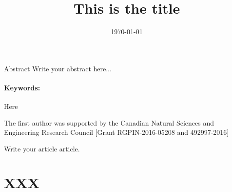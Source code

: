 \documentclass[gdplain]{geradwp}
\title{This is the title}
\date{\today}
\newcommand{\0}{\V{0}}
\newcommand{\1}{\V{1}}
\begin{document}
 

\GDpageCouverture

\begin{GDpagetitre}

\begin{GDauthlist}
\end{GDauthlist}

\begin{GDaffillist}
\end{GDaffillist}

\begin{GDemaillist}
\end{GDemaillist}

\end{GDpagetitre}


\GDabstracts

\begin{GDabstract}{Abstract}
Write your abstract here...

\paragraph{Keywords: }
Here
\end{GDabstract}




\begin{GDacknowledgements}
The first author was supported by the Canadian Natural Sciences and Engineering Research Council [Grant RGPIN-2016-05208 and 492997-2016]
\end{GDacknowledgements}


\GDarticlestart
Write your article article.

\section{XXX}

\nocite{*}


\end{document}
